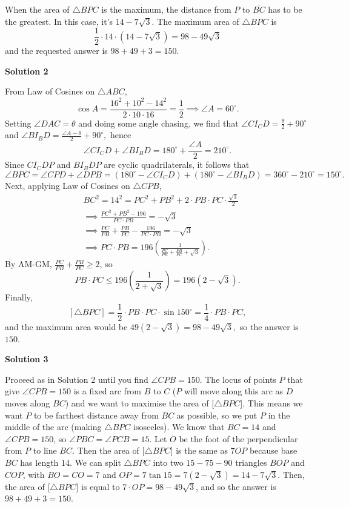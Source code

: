\begin{enumerate}
 When the area of $\triangle BPC$ is the maximum, the distance from $P$ to $\overline{BC}$ has to be the greatest. In this case, it's $14 - 7\sqrt {3}$. The maximum area of $\triangle BPC$ is
 \[\frac {1}{2} \cdot 14 \cdot (14 - 7\sqrt {3}) = 98 - 49 \sqrt {3}\]and the requested answer is $98 + 49 + 3 = \boxed{150}$.

 



\textbf{Solution 2}

From Law of Cosines on $\triangle{ABC}$, 
 \[\cos{A}=\frac{16^2+10^2-14^2}{2\cdot 10\cdot 16}=\frac{1}{2}\implies\angle{A}=60^\circ.\] Setting $\angle{DAC}=\theta$ and doing some angle chasing, we find that $\angle{CI_CD}=\frac{\theta}{2}+90^\circ$ and $\angle{BI_BD}=\frac{\angle{A}-\theta}{2}+90^\circ,$ hence 
 \[\angle{CI_CD}+\angle{BI_BD}=180^\circ+\frac{\angle{A}}{2}=210^\circ.\]Since $CI_CDP$ and $BI_BDP$ are cyclic quadrilaterals, it follows that 
 \[\angle{BPC}=\angle{CPD}+\angle{DPB}=(180^\circ-\angle{CI_CD})+(180^\circ-\angle{BI_BD})=360^\circ-210^\circ=150^\circ.\]Next, applying Law of Cosines on $\triangle{CPB}$,
 \begin{align*} & BC^2=14^2=PC^2+PB^2+2\cdot PB\cdot PC\cdot\frac{\sqrt{3}}{2} \\ & \implies \frac{PC^2+PB^2-196}{PC\cdot PB}=-\sqrt{3} \\ & \implies \frac{PC}{PB}+\frac{PB}{PC}-\frac{196}{PC\cdot PB}=-\sqrt{3} \\ & \implies PC\cdot PB = 196\left(\frac{1}{\frac{PC}{PB}+\frac{PB}{PC}+\sqrt{3}}\right). \end{align*}
 By AM-GM, $\frac{PC}{PB}+\frac{PB}{PC}\geq{2}$, so 
 \[PB\cdot PC\leq 196\left(\frac{1}{2+\sqrt{3}}\right)=196(2-\sqrt{3}).\]Finally, 
 \[[\triangle{BPC}]=\frac12 \cdot PB\cdot PC\cdot\sin{150^\circ}=\frac14 \cdot PB\cdot PC,\]and the maximum area would be $49(2-\sqrt{3})=98-49\sqrt{3},$ so the answer is $\boxed{150}$.

 



\textbf{Solution 3}

Proceed as in Solution 2 until you find $\angle CPB = 150$. The locus of points $P$ that give $\angle CPB = 150$ is a fixed arc from $B$ to $C$ ($P$ will move along this arc as $D$ moves along $BC$) and we want to maximise the area of [$\triangle BPC$]. This means we want $P$ to be farthest distance away from $BC$ as possible, so we put $P$ in the middle of the arc (making $\triangle BPC$ isosceles). We know that $BC=14$ and $\angle CPB = 150$, so $\angle PBC = \angle PCB = 15$. Let $O$ be the foot of the perpendicular from $P$ to line $BC$. Then the area of [$\triangle BPC$] is the same as $7OP$ because base $BC$ has length $14$. We can split $\triangle BPC$ into two $15-75-90$ triangles $BOP$ and $COP$, with $BO=CO=7$ and $OP=7 \tan 15=7(2-\sqrt{3})=14-7\sqrt3$. Then, the area of [$\triangle BPC$] is equal to $7 \cdot OP=98-49\sqrt{3}$, and so the answer is $98+49+3=\boxed{150}$.   

 


\end{enumerate}